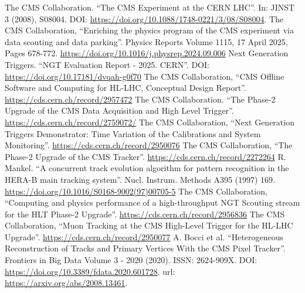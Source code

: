 \documentclass{webofc}
\begin{document}
\begin{thebibliography}{}
%
  The CMS Collaboration. ``The CMS Experiment at the CERN LHC''. In: JINST 3 (2008), S08004. DOI: \url{https://doi.org/10.1088/1748-0221/3/08/S08004}.
  The CMS Collaboration, ``Enriching the physics program of the CMS experiment via data scouting and data parking''. Physics Reports Volume 1115, 17 April 2025, Pages 678-772. \url{https://doi.org/10.1016/j.physrep.2024.09.006}
  Next Generation Triggers. ``NGT Evaluation Report - 2025. CERN''. DOI: \url{https://doi.org/10.17181/dvqah-g0f70}
  The CMS Collaboration, ``CMS Offline Software and Computing for HL-LHC, Conceptual Design Report''. \url{https://cds.cern.ch/record/2957472}  
  The CMS Collaboration. ``The Phase-2 Upgrade of the CMS Data Acquisition and High Level Trigger''. \url{https://cds.cern.ch/record/2759072/}
  The CMS Collaboration, ``Next Generation Triggers Demonstrator: Time Variation of the Calibrations and System Monitoring''. \url{https://cds.cern.ch/record/2950076}
  The CMS Collaboration, ``The Phase-2 Upgrade of the CMS Tracker''. \url{https://cds.cern.ch/record/2272264}
  R. Mankel. ``A concurrent track evolution algorithm for pattern recognition in the HERA-B main tracking system''. Nucl. Instrum. Methods A395 (1997) 169. \url{https://doi.org/10.1016/S0168-9002(97)00705-5}
  The CMS Collaboration, ``Computing and physics performance of a high-throughput NGT Scouting stream for the HLT Phase-2 Upgrade''. \url{https://cds.cern.ch/record/2956836}
  The CMS Collaboration, ``Muon Tracking at the CMS High-Level Trigger for the HL-LHC Upgrade''. \url{https://cds.cern.ch/record/2950077}
  A. Bocci et al. ``Heterogeneous Reconstruction of Tracks and Primary Vertices With the CMS Pixel Tracker''. Frontiers in Big Data Volume 3 - 2020 (2020). ISSN: 2624-909X. DOI: \url{https://doi.org/10.3389/fdata.2020.601728}. url: \url{https://arxiv.org/abs/2008.13461}.
%  
%
\end{thebibliography}
%
\end{document}
